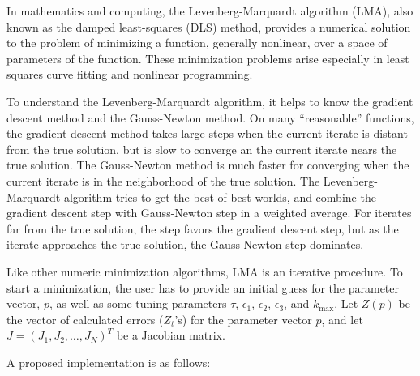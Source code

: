 \documentclass[english,10pt]{llncs}
\begin{document}
In mathematics and computing, the Levenberg-Marquardt algorithm (LMA),
also known as the damped least-squares (DLS) method, provides a
numerical solution to the problem of minimizing a function, generally
nonlinear, over a space of parameters of the function. These
minimization problems arise especially in least squares curve fitting
and nonlinear programming.

To understand the Levenberg-Marquardt algorithm, it helps to know the
gradient descent method and the Gauss-Newton method.  On many
``reasonable'' functions, the gradient descent method takes large
steps when the current iterate is distant from the true solution, but
is slow to converge an the current iterate nears the true solution.
The Gauss-Newton method is much faster for converging when the current
iterate is in the neighborhood of the true solution.  The
Levenberg-Marquardt algorithm tries to get the best of best worlds,
and combine the gradient descent step with Gauss-Newton step in a
weighted average.  For iterates far from the true solution, the step
favors the gradient descent step, but as the iterate approaches the
true solution, the Gauss-Newton step dominates.

Like other numeric minimization algorithms, LMA is an iterative
procedure.  To start a minimization, the user has to provide an
initial guess for the parameter vector, $p$, as well as some tuning
parameters $\tau$, $\epsilon_1$, $\epsilon_2$, $\epsilon_3$, and
$k_{\max}$.  Let $Z(p)$ be the vector of calculated errors ($Z_t$'s)
for the parameter vector $p$, and let $J = {(J_{1}, J_{2}, \ldots,
  J_N)}^T$ be a Jacobian matrix.

A proposed implementation is as follows:
\end{document}
